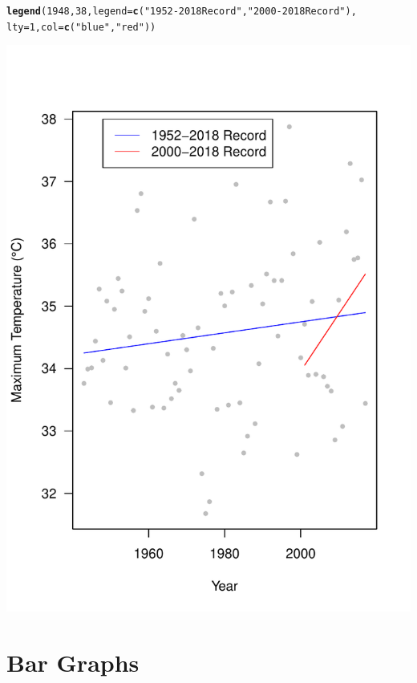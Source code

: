\documentclass{article}\usepackage[]{graphicx}\usepackage[]{color}
\makeatletter
\def\maxwidth{ %
  \ifdim\Gin@nat@width>\linewidth
    \linewidth
  \else
    \Gin@nat@width
  \fi
}
\newcommand{\hlnum}[1]{\textcolor[rgb]{0.686,0.059,0.569}{#1}}%
\newcommand{\hlstr}[1]{\textcolor[rgb]{0.192,0.494,0.8}{#1}}%
\newcommand{\hlstd}[1]{\textcolor[rgb]{0.345,0.345,0.345}{#1}}%
\newcommand{\hlkwc}[1]{\textcolor[rgb]{0.333,0.667,0.333}{#1}}%
\newcommand{\hlkwd}[1]{\textcolor[rgb]{0.737,0.353,0.396}{\textbf{#1}}}%
\newenvironment{kframe}{%
 \def\at@end@of@kframe{}%
 \ifinner\ifhmode%
  \def\at@end@of@kframe{\end{minipage}}%
  \begin{minipage}{\columnwidth}%
 \fi\fi%
 \def\FrameCommand##1{\hskip\@totalleftmargin \hskip-\fboxsep
 \colorbox{shadecolor}{##1}\hskip-\fboxsep
     \hskip-\linewidth \hskip-\@totalleftmargin \hskip\columnwidth}%
 \MakeFramed {\advance\hsize-\width
   \@totalleftmargin\z@ \linewidth\hsize
   \@setminipage}}%
 {\par\unskip\endMakeFramed%
 \at@end@of@kframe}
\newenvironment{knitrout}{}{} %
\makeatother
\begin{document}
\begin{knitrout}
\begin{kframe}
\begin{alltt}
\hlkwd{legend}\hlstd{(}\hlnum{1948}\hlstd{,} \hlnum{38}\hlstd{,} \hlkwc{legend}\hlstd{=}\hlkwd{c}\hlstd{(}\hlstr{"1952-2018 Record"}\hlstd{,} \hlstr{"2000-2018 Record"}\hlstd{),}
       \hlkwc{lty}\hlstd{=}\hlnum{1}\hlstd{,} \hlkwc{col}\hlstd{=}\hlkwd{c}\hlstd{(}\hlstr{"blue"}\hlstd{,} \hlstr{"red"}\hlstd{))}
\end{alltt}
\end{kframe}
\includegraphics[width=\maxwidth]{figure/fig_height__3-1} 

\end{knitrout}


\clearpage
\section{Bar Graphs}
\end{document}
